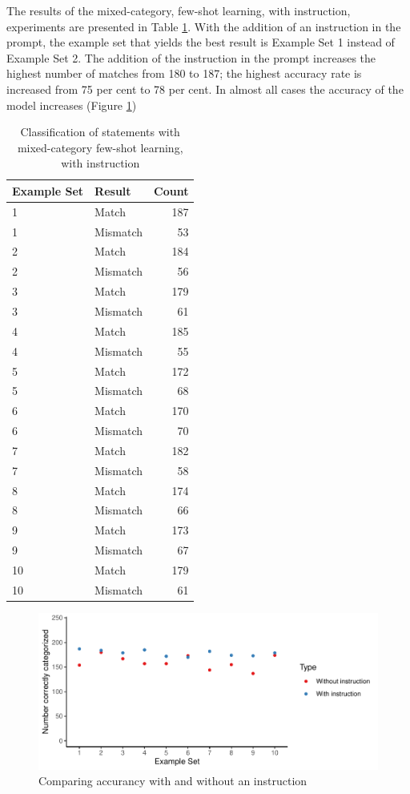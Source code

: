 \documentclass[12pt,]{article}
\begin{document}
The results of the mixed-category, few-shot learning, with instruction, experiments are presented in Table \ref{tab:fewshotmixedinstruct}. With the addition of an instruction in the prompt, the example set that yields the best result is Example Set 1 instead of Example Set 2. The addition of the instruction in the prompt increases the highest number of matches from 180 to 187; the highest accuracy rate is increased from 75 per cent to 78 per cent. In almost all cases the accuracy of the model increases (Figure \ref{fig:comparison})

\begin{table}

\caption{\label{tab:fewshotmixedinstruct}Classification of statements with mixed-category few-shot learning, with instruction}
\centering
\begin{tabular}[t]{llr}
\toprule
Example Set & Result & Count\\
\midrule
1 & Match & 187\\
1 & Mismatch & 53\\
2 & Match & 184\\
2 & Mismatch & 56\\
3 & Match & 179\\
3 & Mismatch & 61\\
4 & Match & 185\\
4 & Mismatch & 55\\
5 & Match & 172\\
5 & Mismatch & 68\\
6 & Match & 170\\
6 & Mismatch & 70\\
7 & Match & 182\\
7 & Mismatch & 58\\
8 & Match & 174\\
8 & Mismatch & 66\\
9 & Match & 173\\
9 & Mismatch & 67\\
10 & Match & 179\\
10 & Mismatch & 61\\
\bottomrule
\end{tabular}
\end{table}

\begin{figure}
\centering
\includegraphics{paper_files/figure-latex/comparison-1.pdf}
\caption{\label{fig:comparison}Comparing accurancy with and without an instruction}
\end{figure}
\end{document}
